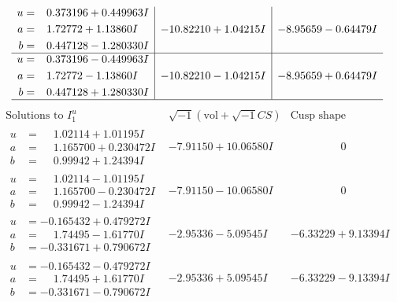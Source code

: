 \documentclass[1p]{elsarticle_modified}
\theoremstyle{definition}
\newcommand{\I}{\sqrt{-1}}
\begin{document}
$$\begin{array}{c|c|c}
\begin{aligned}
u &= \phantom{-}0.373196 + 0.449963 I \\
a &= \phantom{-}1.72772 + 1.13860 I \\
b &= \phantom{-}0.447128 - 1.280330 I\end{aligned}
 & -10.82210 + 1.04215 I & -8.95659 - 0.64479 I \\ \hline\begin{aligned}
u &= \phantom{-}0.373196 - 0.449963 I \\
a &= \phantom{-}1.72772 - 1.13860 I \\
b &= \phantom{-}0.447128 + 1.280330 I\end{aligned}
 & -10.82210 - 1.04215 I & -8.95659 + 0.64479 I\\
 \hline 
 \end{array}$$\newpage$$\begin{array}{c|c|c}  
\text{Solutions to }I^u_{1}& \I (\text{vol} + \sqrt{-1}CS) & \text{Cusp shape}\\
 \hline 
\begin{aligned}
u &= \phantom{-}1.02114 + 1.01195 I \\
a &= \phantom{-}1.165700 + 0.230472 I \\
b &= \phantom{-}0.99942 + 1.24394 I\end{aligned}
 & -7.91150 + 10.06580 I & \phantom{-0.000000 } 0 \\ \hline\begin{aligned}
u &= \phantom{-}1.02114 - 1.01195 I \\
a &= \phantom{-}1.165700 - 0.230472 I \\
b &= \phantom{-}0.99942 - 1.24394 I\end{aligned}
 & -7.91150 - 10.06580 I & \phantom{-0.000000 } 0 \\ \hline\begin{aligned}
u &= -0.165432 + 0.479272 I \\
a &= \phantom{-}1.74495 - 1.61770 I \\
b &= -0.331671 + 0.790672 I\end{aligned}
 & -2.95336 - 5.09545 I & -6.33229 + 9.13394 I \\ \hline\begin{aligned}
u &= -0.165432 - 0.479272 I \\
a &= \phantom{-}1.74495 + 1.61770 I \\
b &= -0.331671 - 0.790672 I\end{aligned}
 & -2.95336 + 5.09545 I & -6.33229 - 9.13394 I \\ \hline\begin{aligned}

\end{aligned}
\end{array}$$
\end{document}
